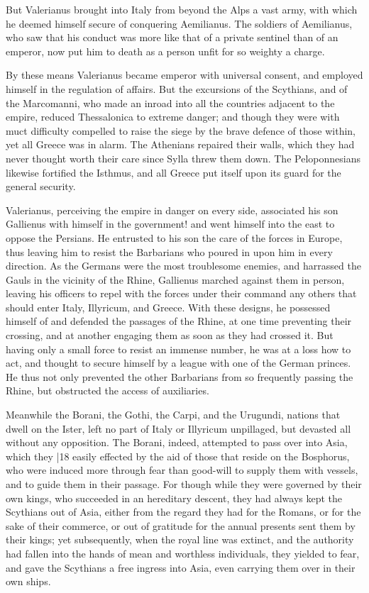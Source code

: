 But Valerianus brought into Italy from beyond the Alps a vast army, with which he deemed himself secure of conquering Aemilianus. The soldiers of Aemilianus, who saw that his conduct was more like that of a private sentinel than of an emperor, now put him to death as a person unfit for so weighty a charge.

By these means Valerianus became emperor with universal consent, and employed himself in the regulation of affairs. But the excursions of the Scythians, and of the Marcomanni, who made an inroad into all the countries adjacent to the empire, reduced Thessalonica to extreme danger; and though they were with muct difficulty compelled to raise the siege by the brave defence of those within, yet all Greece was in alarm. The Athenians repaired their walls, which they had never thought worth their care since Sylla threw them down. The Peloponnesians likewise fortified the Isthmus, and all Greece put itself upon its guard for the general security.

Valerianus, perceiving the empire in danger on every side, associated his son Gallienus with himself in the government! and went himself into the east to oppose the Persians. He entrusted to his son the care of the forces in Europe, thus leaving him to resist the Barbarians who poured in upon him in every direction. As the Germans were the most troublesome enemies, and harrassed the Gauls in the vicinity of the Rhine, Gallienus marched against them in person, leaving his officers to repel with the forces under their command any others that should enter Italy, Illyricum, and Greece. With these designs, he possessed himself of and defended the passages of the Rhine, at one time preventing their crossing, and at another engaging them as soon as they had crossed it. But having only a small force to resist an immense number, he was at a loss how to act, and thought to secure himself by a league with one of the German princes. He thus not only prevented the other Barbarians from so frequently passing the Rhine, but obstructed the access of auxiliaries.

Meanwhile the Borani, the Gothi, the Carpi, and the Urugundi, nations that dwell on the Ister, left no part of Italy or Illyricum unpillaged, but devasted all without any opposition. The Borani, indeed, attempted to pass over into Asia, which they
|18 easily effected by the aid of those that reside on the Bosphorus, who were induced more through fear than good-will to supply them with vessels, and to guide them in their passage. For though while they were governed by their own kings, who succeeded in an hereditary descent, they had always kept the Scythians out of Asia, either from the regard they had for the Romans, or for the sake of their commerce, or out of gratitude for the annual presents sent them by their kings; yet subsequently, when the royal line was extinct, and the authority had fallen into the hands of mean and worthless individuals, they yielded to fear, and gave the Scythians a free ingress into Asia, even carrying them over in their own ships.

